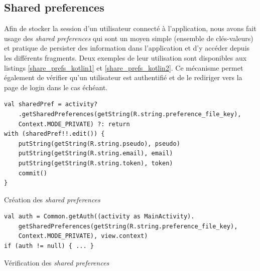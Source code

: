 \subsection{Shared preferences}
Afin de stocker la session d'un utilisateur connecté à l'application, nous avons fait usage des \textit{shared preferences} qui sont un moyen simple (ensemble de clés-valeurs) et pratique de persister des information dans l'application et d'y accéder depuis les différents fragments. Deux exemples de leur utilisation sont disponibles aux listings \ref{share_prefs_kotlin1} et \ref{share_prefs_kotlin2}. Ce mécanisme permet également de vérifier qu'un utilisateur est authentifié et de le rediriger vers la page de login dans le cas échéant.
\bigbreak
\begin{code}
    \begin{verbatim}
val sharedPref = activity?
    .getSharedPreferences(getString(R.string.preference_file_key), 
    Context.MODE_PRIVATE) ?: return
with (sharedPref!!.edit()) {
    putString(getString(R.string.pseudo), pseudo)
    putString(getString(R.string.email), email)
    putString(getString(R.string.token), token)
    commit()
}
    \end{verbatim}
    \caption{Création des \textit{shared preferences}}
    \label{share_prefs_kotlin1}
\end{code}
\bigbreak

\bigbreak
\begin{code}
    \begin{verbatim}
val auth = Common.getAuth((activity as MainActivity).
    getSharedPreferences(getString(R.string.preference_file_key),
    Context.MODE_PRIVATE), view.context)
if (auth != null) { ... }
    \end{verbatim}
    \caption{Vérification des \textit{shared preferences}}
    \label{share_prefs_kotlin2}
\end{code}
\bigbreak

